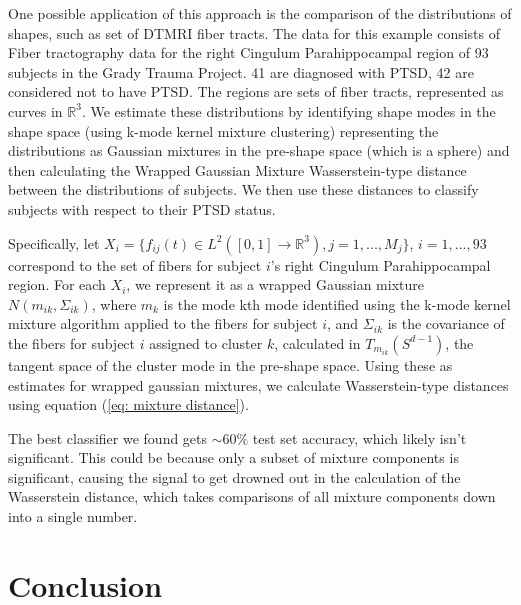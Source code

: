 \documentclass[]{article}
\begin{document}
One possible application of this approach is the comparison of the distributions of shapes, such as set of DTMRI fiber tracts. The data for this example consists of Fiber tractography data for the right Cingulum Parahippocampal region of 93 subjects in the Grady Trauma Project. 41 are diagnosed with PTSD, 42 are considered not to have PTSD. The regions are sets of fiber tracts, represented as curves in $\mathbb{R}^3$. We estimate these distributions by identifying shape modes in the shape space (using k-mode kernel mixture clustering) representing the distributions as Gaussian mixtures in the pre-shape space (which is a sphere) and then calculating the Wrapped Gaussian Mixture Wasserstein-type distance between the distributions of subjects. We then use these distances to classify subjects with respect to their PTSD status.

Specifically, let $X_i = \{ f_{ij}(t) \in L^2([0,1] \to \mathbb{R}^3), j = 1,...,M_j\}$, $i=1,...,93$ correspond to the set of fibers for subject $i$'s right Cingulum Parahippocampal region. For each $X_i$, we represent it as a wrapped Gaussian mixture $N(m_{ik}, \Sigma_{ik})$, where $m_k$ is the mode kth mode identified using the k-mode kernel mixture algorithm applied to the fibers for subject $i$, and $\Sigma_{ik}$ is the covariance of the fibers for subject $i$ assigned to cluster $k$, calculated in $T_{m_{ik}}(S^{d-1})$, the tangent space of the cluster mode in the pre-shape space. Using these as estimates for wrapped gaussian mixtures, we calculate Wasserstein-type distances using equation (\ref{eq: mixture distance}).       

The best classifier we found gets $\sim 60\%$ test set accuracy, which likely isn't significant. This could be because only a subset of mixture components is significant, causing the signal to get drowned out in the calculation of the Wasserstein distance, which takes comparisons of all mixture components down into a single number. 

\section{Conclusion}\label{section: conclusion}

\newpage



\cite{https://doi.org/10.48550/arxiv.1907.05254}
\cite{https://doi.org/10.48550/arxiv.0801.2250}
\cite{10.1307/mmj/1029003026}
\cite{COTFNT}
\cite{Ambrosio2013}
\cite{WGOT}
\end{document}
